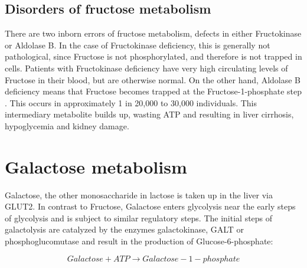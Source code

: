 \documentclass{tufte-handout}
\begin{document}
\subsection{Disorders of fructose metabolism}

There are two inborn errors of fructose metabolism, defects in either Fructokinase or Aldolase B.  In the case of Fructokinase deficiency, this is generally not pathological, since Fructose is not phosphorylated, and therefore is not trapped in cells.  Patients with Fructokinase deficiency have very high circulating levels of Fructose in their blood, but are otherwise normal.  On the other hand, Aldolase B deficiency means that Fructose becomes trapped at the Fructose-1-phosphate step \citep{Cross1988}.  This occurs in approximately 1 in 20,000 to 30,000 individuals.  This intermediary metabolite builds up, wasting ATP and resulting in liver cirrhosis, hypoglycemia and kidney damage.

\section{Galactose metabolism}

Galactose, the other monosaccharide in lactose is taken up in the liver via GLUT2.  In contrast to Fructose, Galactose enters glycolysis near the early steps of glycolysis and is subject to similar regulatory steps.  The initial steps of galactolysis are catalyzed by the enzymes galactokinase, GALT or phosphoglucomutase and result in the production of Glucose-6-phosphate:

\begin{equation}
Galactose + ATP \rightarrow Galactose-1-phosphate
\end{equation}
\end{document}
